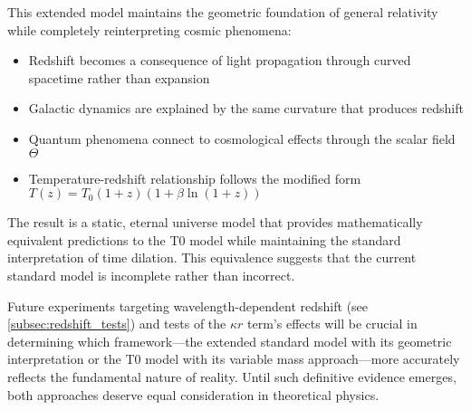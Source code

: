 \documentclass[12pt,a4paper]{article}
\begin{document}
	This extended model maintains the geometric foundation of general relativity\cite{einstein1915} while completely reinterpreting cosmic phenomena:
	\begin{itemize}
		\item Redshift becomes a consequence of light propagation through curved spacetime rather than expansion\cite{pascher_messdifferenzen_2025}
		\item Galactic dynamics are explained by the same curvature that produces redshift\cite{pascher_galaxies_2025}
		\item Quantum phenomena connect to cosmological effects through the scalar field $\Theta$\cite{pascher_lagrange_2025}
		\item Temperature-redshift relationship follows the modified form $T(z) = T_0 (1+z)(1+\beta \ln(1+z))$\cite{pascher_temp_2025}
	\end{itemize}
	
	The result is a static, eternal universe model that provides mathematically equivalent predictions to the T0 model while maintaining the standard interpretation of time dilation. This equivalence suggests that the current standard model is incomplete rather than incorrect.
	
	Future experiments targeting wavelength-dependent redshift (see \cref{subsec:redshift_tests}) and tests of the $\kappa r$ term's effects will be crucial in determining which framework—the extended standard model with its geometric interpretation or the T0 model with its variable mass approach—more accurately reflects the fundamental nature of reality. Until such definitive evidence emerges, both approaches deserve equal consideration in theoretical physics.
	
\end{document}

